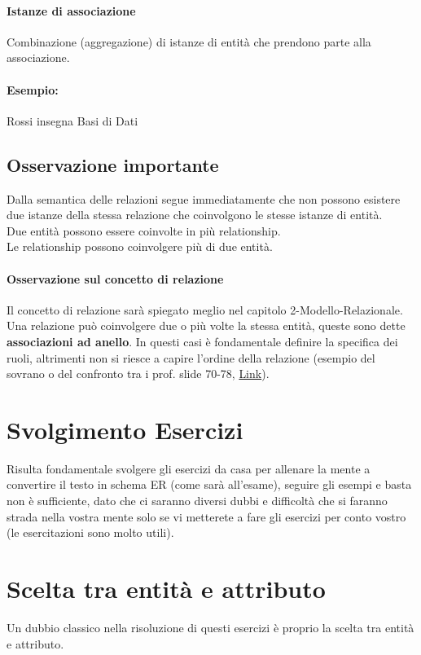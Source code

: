 \paragraph*{Istanze di associazione}
Combinazione (aggregazione) di istanze di entità che prendono parte alla associazione.
\paragraph*{Esempio:} Rossi insegna Basi di Dati
\subsection*{Osservazione importante}
Dalla semantica delle relazioni segue immediatamente che non possono esistere due
istanze della stessa relazione che coinvolgono le stesse istanze di entità.
\\ Due entità possono essere coinvolte in più relationship.
\\ Le relationship possono coinvolgere più di due entità.

\paragraph*{Osservazione sul concetto di relazione} Il concetto di relazione sarà
spiegato meglio nel capitolo 2-Modello-Relazionale.
Una relazione può coinvolgere due o più volte la stessa entità, queste sono
dette \textbf{associazioni ad anello}. In questi casi è fondamentale definire
la specifica dei ruoli, altrimenti non si riesce a capire l'ordine della relazione
(esempio del sovrano o del confronto tra i prof. slide 70-78, 
\href{https://elearning.unimib.it/pluginfile.php/1486876/mod_resource/content/1/Modello%20ER.pdf}{Link}).
\section{Svolgimento Esercizi}
Risulta fondamentale svolgere gli esercizi da casa per allenare la mente a convertire
il testo in schema ER (come sarà all'esame), seguire gli esempi e basta non è sufficiente,
dato che ci saranno diversi dubbi e difficoltà che si faranno strada nella vostra
mente solo se vi metterete a fare gli esercizi per conto vostro (le esercitazioni
sono molto utili).
\section{Scelta tra entità e attributo}
Un dubbio classico nella risoluzione di questi esercizi è proprio la scelta tra
entità e attributo.
